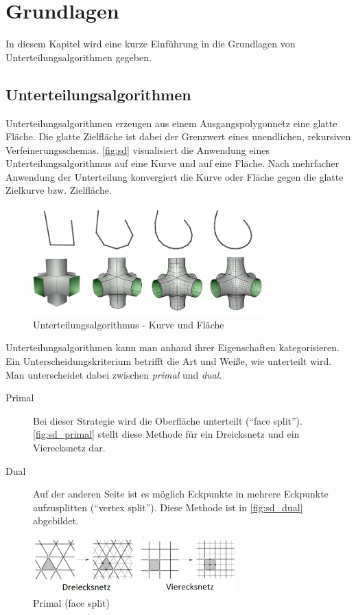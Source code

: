 \chapter{Grundlagen}

In diesem Kapitel wird eine kurze Einführung in die Grundlagen von Unterteilungsalgorithmen gegeben.

\section{Unterteilungsalgorithmen}

Unterteilungsalgorithmen erzeugen aus einem Ausgangspolygonnetz eine glatte Fläche.
Die glatte Zielfläche ist dabei der Grenzwert eines unendlichen, rekursiven Verfeinerungsschemas.
\autoref{fig:sd} visualisiert die Anwendung eines Unterteilungsalgorithmus auf eine Kurve und auf eine Fläche.
Nach mehrfacher Anwendung der Unterteilung konvergiert die Kurve oder Fläche gegen die glatte Zielkurve bzw. Zielfläche.

\begin{figure}
  \centering
  \includegraphics[width=0.8\textwidth]{content/media/sd.png}
  \caption{Unterteilungsalgorithmus - Kurve und Fläche \cite{Standford.24.07.2015}}
  \label{fig:sd}
\end{figure}

Unterteilungsalgorithmen kann man anhand ihrer Eigenschaften kategorisieren.
Ein Unterscheidungskriterium betrifft die Art und Weiße, wie unterteilt wird.
Man unterscheidet dabei zwischen \emph{primal} und \emph{dual}.

\begin{description}
 \item[Primal] Bei dieser Strategie wird die Oberfläche unterteilt (\enquote{face split}).
\autoref{fig:sd_primal} stellt diese Methode für ein Dreicksnetz und ein Vierecksnetz dar.
 \item[Dual] Auf der anderen Seite ist es möglich Eckpunkte in mehrere Eckpunkte aufzusplitten (\enquote{vertex split}).
 Diese Methode ist in \autoref{fig:sd_dual} abgebildet.

\end{description}
\begin{figure}
  \centering
  \includegraphics[width=0.7\textwidth]{content/media/sd_primal}
  \caption{Primal (face split) \cite{Standford.24.07.2015}}
  \label{fig:sd_primal}
\end{figure}

